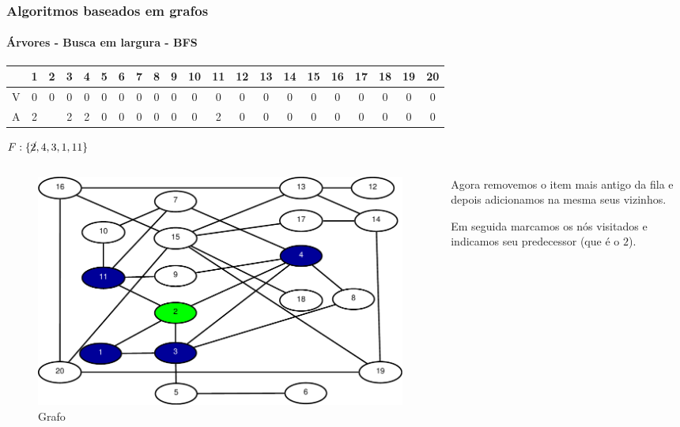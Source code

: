 \begin{frame}
	\frametitle{Algoritmos baseados em grafos}
	\framesubtitle{Árvores - Busca em largura - BFS}
	\setlength{\tabcolsep}{0.5em}
	\begin{tabular}{|c|c|c|c|c|c|c|c|c|c|c|c|c|c|c|c|c|c|c|c|c|}
		\hline
		\rule[0ex]{0pt}{0ex}&1&2&3&4&5&6&7&8&9&10&11&12&13&14&15&16&17&18&19&20 \\
		\hline
		\rule[0ex]{0pt}{0ex}V&0&0&0&0&0&0&0&0&0&0&0&0&0&0&0&0&0&0&0&0 \\
		\hline
		\rule[0ex]{0pt}{0ex}A&2& &2&2&0&0&0&0&0&0&2&0&0&0&0&0&0&0&0&0 \\
		\hline
	\end{tabular}
	\par $F:\{\cancel{2},4,3,1,11\}$
	\begin{columns}
		\begin{column}{0.5\textwidth}
			\begin{figure}
				\centering
				\includegraphics[width=\linewidth]{images/buscaEmLargura01}
				\caption{Grafo}
				\label{fig:buscaemlargura02}
			\end{figure}
		\end{column}
		\begin{column}{0.5\textwidth}
			\par Agora removemos o item mais antigo da fila e depois adicionamos na mesma seus vizinhos.
			\par Em seguida marcamos os nós visitados e indicamos seu predecessor (que é o $2$).
		\end{column}
	\end{columns}
\end{frame}

